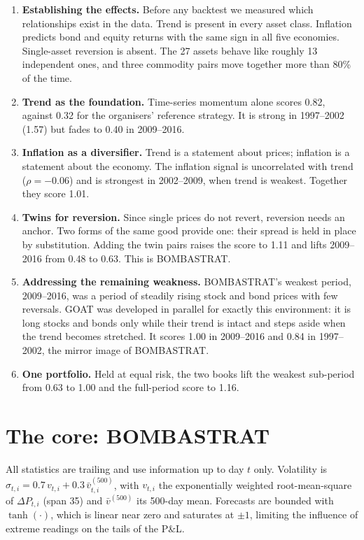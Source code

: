 \documentclass[10.5pt,a4paper]{article}
\begin{document}
\begin{enumerate}
\item \textbf{Establishing the effects.} Before any backtest we measured which relationships exist in the data. Trend is present in every asset class. Inflation predicts bond and equity returns with the same sign in all five economies. Single-asset reversion is absent. The 27 assets behave like roughly 13 independent ones, and three commodity pairs move together more than 80\% of the time.
\item \textbf{Trend as the foundation.} Time-series momentum alone scores 0.82, against 0.32 for the organisers' reference strategy. It is strong in 1997--2002 (1.57) but fades to 0.40 in 2009--2016.
\item \textbf{Inflation as a diversifier.} Trend is a statement about prices; inflation is a statement about the economy. The inflation signal is uncorrelated with trend ($\rho=-0.06$) and is strongest in 2002--2009, when trend is weakest. Together they score 1.01.
\item \textbf{Twins for reversion.} Since single prices do not revert, reversion needs an anchor. Two forms of the same good provide one: their spread is held in place by substitution. Adding the twin pairs raises the score to 1.11 and lifts 2009--2016 from 0.48 to 0.63. This is BOMBASTRAT.
\item \textbf{Addressing the remaining weakness.} BOMBASTRAT's weakest period, 2009--2016, was a period of steadily rising stock and bond prices with few reversals. GOAT was developed in parallel for exactly this environment: it is long stocks and bonds only while their trend is intact and steps aside when the trend becomes stretched. It scores 1.00 in 2009--2016 and 0.84 in 1997--2002, the mirror image of BOMBASTRAT.
\item \textbf{One portfolio.} Held at equal risk, the two books lift the weakest sub-period from 0.63 to 1.00 and the full-period score to 1.16.
\end{enumerate}

\section{The core: BOMBASTRAT}
All statistics are trailing and use information up to day $t$ only. Volatility is $\sigma_{t,i}=0.7\,v_{t,i}+0.3\,\bar v^{(500)}_{t,i}$, with $v_{t,i}$ the exponentially weighted root-mean-square of $\Delta P_{t,i}$ (span 35) and $\bar v^{(500)}$ its 500-day mean. Forecasts are bounded with $\tanh(\cdot)$, which is linear near zero and saturates at $\pm1$, limiting the influence of extreme readings on the tails of the P\&L.
\end{document}
